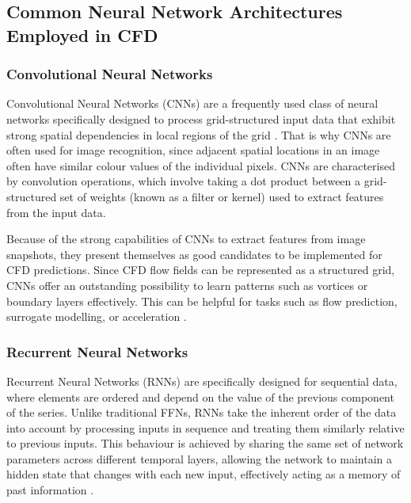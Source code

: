\subsection{Common Neural Network Architectures Employed in CFD}
\label{subsect: commonNN}

\subsubsection{Convolutional Neural Networks}
Convolutional Neural Networks (CNNs) are a frequently used class of neural networks specifically designed to process grid-structured input data that exhibit strong spatial dependencies in local regions of
the grid \cite{Aggarwal2018}. That is why CNNs are often used for image recognition, since adjacent spatial locations in an image often have similar colour values of the individual pixels. CNNs are characterised by convolution operations, which involve taking a dot product between a grid-structured set of weights (known as a filter or kernel) used to extract features from the input data.

Because of the strong capabilities of CNNs to extract features from image snapshots, they present
themselves as good candidates to be implemented for CFD predictions. Since CFD flow fields can
be represented as a structured grid, CNNs offer an outstanding possibility to learn patterns such as
vortices or boundary layers effectively. This can be helpful for tasks such as flow prediction, surrogate modelling, or acceleration \cite{Lee_You_2019, Guo2016}.


\subsubsection{Recurrent Neural Networks}

Recurrent Neural Networks (RNNs) are specifically designed for sequential data, where elements are ordered and depend on the value of the previous component of the series. Unlike traditional FFNs, RNNs take the inherent order of the data into account by processing inputs in sequence and treating them similarly relative to previous inputs. This behaviour is achieved by sharing the same set of network parameters across different temporal layers, allowing the network to maintain a hidden state that changes with each new input, effectively acting as a memory of past information \cite{Aggarwal2018}. 

